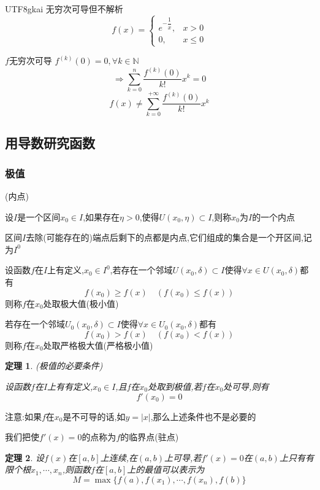 \documentclass{article}
\newtheorem{theorem}{定理}[subsection]
\newenvironment{identification}{%
\heiti{定义}\kaishu
}{%
}
\newcommand{\parameter}[1]{\left(#1\right)}
\begin{document}
\begin{CJK}{UTF8}{gkai}
无穷次可导但不解析
\begin{equation}
    f(x) = 
    \begin{cases}
        e^{-\dfrac{1}{x}}, & x > 0\\
        0, & x \leq 0
    \end{cases}
\end{equation}
    
$f$无穷次可导 $f^{(k)}(0) = 0,\forall k\in \mathbb{N}$\\
\[\Rightarrow \sum_{k=0}^n\dfrac{f^{(k)}(0)}{k!}x^k = 0\]
\[f(x)\neq \sum_{k=0}^{+\infty}\dfrac{f^{(k)}(0)}{k!}x^k\]

\subsection{用导数研究函数}
\subsubsection{极值}
\begin{identification}
  (内点)

设$I$是一个区间$x_0\in I$,如果存在$\eta >0$,使得$U(x_0,\eta) \subset I$,则称$x_0$为$I$的一个内点

区间$I$去除(可能存在的)端点后剩下的点都是内点,它们组成的集合是一个开区间,记为$I^0$\\
\end{identification}

\begin{identification}
设函数$f$在$I$上有定义,$x_0\in I^0$,若存在一个邻域$U(x_0,\delta)\subset I$使得$\forall x \in U(x_0,\delta)$都有
\[f(x_0) \geq f(x) \quad \parameter{f(x_0) \leq f(x)}\]
则称$f$在$x_0$处取极大值(极小值)

若存在一个邻域$U_0(x_0,\delta)\subset I$使得$\forall x \in U_0(x_0,\delta)$都有
\[f(x_0) > f(x) \quad \parameter{f(x_0) < f(x)}\]
则称$f$在$x_0$处取严格极大值(严格极小值)
\end{identification}

\begin{theorem}
  (极值的必要条件)

  设函数$f$在$I$上有有定义,$x_0\in I$,且$f$在$x_0$处取到极值,若$f$在$x_0$处可导,则有
  \[f'(x_0) = 0\]
\end{theorem}

注意:如果$f$在$x_0$是不可导的话,如$y = |x|$,那么上述条件也不是必要的

\begin{identification}
我们把使$f'(x) = 0$的点称为$f$的临界点(驻点)
\end{identification}
\begin{theorem}
  设$f(x)$在$[a,b]$上连续,在$(a,b)$上可导,若$f'(x) = 0$在$(a,b)$上只有有限个根$x_1,\cdots ,x_n$,则函数$f$在$[a,b]$上的最值可以表示为
  \[M = \max\{f(a),f(x_1),\cdots,f(x_n),f(b)\}\]


\end{theorem}
\end{CJK}
\end{document}
